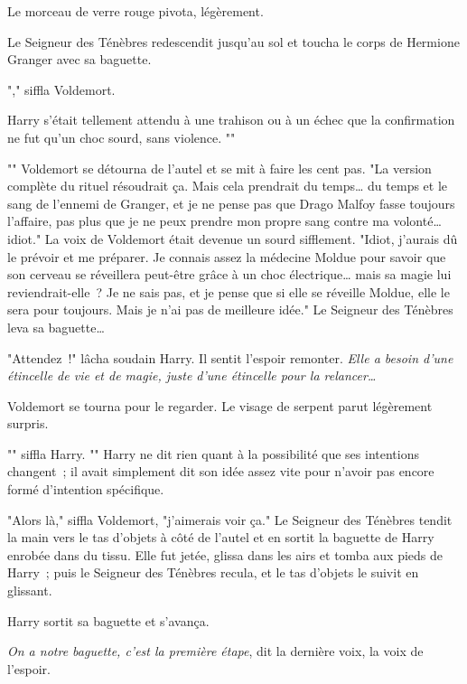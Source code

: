 Le morceau de verre rouge pivota, légèrement.

Le Seigneur des Ténèbres redescendit jusqu'au sol et toucha le corps de Hermione Granger avec sa baguette.

"," siffla Voldemort.

Harry s'était tellement attendu à une trahison ou à un échec que la confirmation ne fut qu'un choc sourd, sans violence. ""

"" Voldemort se détourna de l'autel et se mit à faire les cent pas. "La version complète du rituel résoudrait ça. Mais cela prendrait du temps… du temps et le sang de l'ennemi de Granger, et je ne pense pas que Drago Malfoy fasse toujours l'affaire, pas plus que je ne peux prendre mon propre sang contre ma volonté… idiot." La voix de Voldemort était devenue un sourd sifflement. "Idiot, j'aurais dû le prévoir et me préparer. Je connais assez la médecine Moldue pour savoir que son cerveau se réveillera peut-être grâce à un choc électrique… mais sa magie lui reviendrait-elle~? Je ne sais pas, et je pense que si elle se réveille Moldue, elle le sera pour toujours. Mais je n'ai pas de meilleure idée." Le Seigneur des Ténèbres leva sa baguette…

"Attendez~!" lâcha soudain Harry. Il sentit l'espoir remonter. \emph{Elle a besoin d'une étincelle de vie et de magie, juste d'une étincelle pour la relancer…}

Voldemort se tourna pour le regarder. Le visage de serpent parut légèrement surpris.

"" siffla Harry. "" Harry ne dit rien quant à la possibilité que ses intentions changent~; il avait simplement dit son idée assez vite pour n'avoir pas encore formé d'intention spécifique.

"Alors là," siffla Voldemort, "j'aimerais voir ça." Le Seigneur des Ténèbres tendit la main vers le tas d'objets à côté de l'autel et en sortit la baguette de Harry enrobée dans du tissu. Elle fut jetée, glissa dans les airs et tomba aux pieds de Harry~; puis le Seigneur des Ténèbres recula, et le tas d'objets le suivit en glissant.

Harry sortit sa baguette et s'avança.

\emph{On a notre baguette, c'est la première étape}, dit la dernière voix, la voix de l'espoir.

